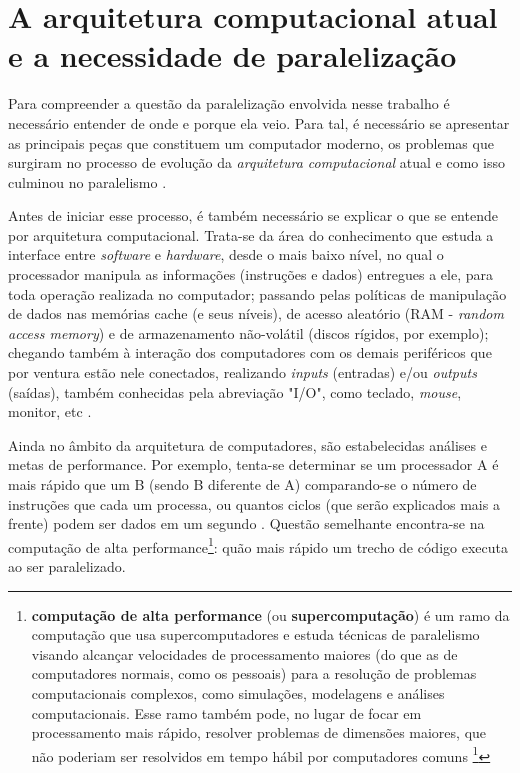     
\chapter{A arquitetura computacional atual e a necessidade de paralelização}

    Para compreender a questão da paralelização envolvida nesse trabalho é 
    necessário entender de onde e porque ela veio. Para tal, é necessário 
    se apresentar as principais peças que constituem um computador moderno, 
    os problemas que surgiram no processo de evolução da \textit{arquitetura 
    computacional}  atual e como isso 
	culminou no paralelismo \cite{LLNL:parcomp}.

    Antes de iniciar esse processo, é também necessário se explicar o que se 
    entende por arquitetura computacional. Trata-se da área do conhecimento 
    que estuda a interface entre \textit{software} e \textit{hardware}, desde 
    o mais baixo nível, no qual o processador manipula as informações 
    (instruções e dados) entregues a ele, para toda operação realizada no 
    computador; passando pelas políticas de manipulação de dados nas memórias 
    cache (e seus níveis), de acesso aleatório (RAM - \textit{random access 
    memory}) e de armazenamento não-volátil (discos rígidos, por exemplo); 
    chegando também à interação dos computadores com os demais periféricos que 
    por ventura estão nele conectados, realizando \textit{inputs} (entradas) 
    e/ou \textit{outputs} (saídas), também conhecidas pela abreviação "I/O", 
    como teclado, \textit{mouse}, monitor, etc \cite{Catsoulis}.
    
    Ainda no âmbito da arquitetura de computadores, são estabelecidas análises e 
    metas de performance. Por exemplo, tenta-se determinar se um processador A é 
    mais rápido que um B (sendo B diferente de A) comparando-se o número de 
    instruções que cada um processa, ou quantos ciclos (que serão explicados mais 
    a frente) podem ser dados em um segundo \cite{wiki:comparch}. 
    Questão semelhante encontra-se na 
    computação de alta performance\footnote{\textbf{computação de alta performance} 
    (ou \textbf{supercomputação}) é um ramo da computação que usa supercomputadores 
    e estuda técnicas de paralelismo visando alcançar velocidades de processamento 
    maiores (do que as de computadores normais, como os pessoais) para a resolução de 
    problemas computacionais complexos, como simulações, 
    modelagens e análises computacionais. Esse ramo também pode, no lugar de focar 
    em processamento mais rápido, resolver problemas de dimensões maiores, que não 
    poderiam ser resolvidos em tempo hábil por computadores comuns \footcite{techo:hpc}}: 
    quão mais rápido um trecho de código executa ao ser paralelizado.
   
